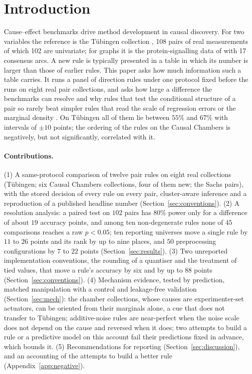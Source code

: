 \section{Introduction}\label{sec:intro}

Cause--effect benchmarks drive method development in causal discovery. For two variables the reference is the T\"ubingen collection \citep{mooij2016distinguishing}, 108 pairs of real measurements of which 102 are univariate; for graphs it is the protein-signalling data of \citet{sachs2005causal} with 17 consensus arcs. A new rule is typically presented in a table in which its number is larger than those of earlier rules. This paper asks how much information such a table carries. It runs a panel of direction rules under one protocol fixed before the runs on eight real pair collections, and asks how large a difference the benchmarks can resolve and why rules that test the conditional structure of a pair \citep{hoyer2009nonlinear,peters2014identifiability,hyvarinen2013pairwise,immer2023loci,lorch2022amortized} so rarely beat simpler rules that read the scale of regression errors or the marginal density \citep{blobaum2018cause,daniusis2010inferring,stienstra2026oneruler}. On T\"ubingen all of them lie between $55\%$ and $67\%$ with intervals of $\pm10$ points; the ordering of the rules on the Causal Chambers \citep{gamella2025chamber} is negatively, but not significantly, correlated with it.

\paragraph{Contributions.} (1) A same-protocol comparison of twelve pair rules on eight real collections (T\"ubingen; six Causal Chambers collections, four of them new; the Sachs pairs), with the stored decision of every rule on every pair, cluster-aware inference and a reproduction of a published headline number (Section~\ref{sec:conventions}). (2) A resolution analysis: a paired test on $102$ pairs has $80\%$ power only for a difference of about $19$ accuracy points, and among ten non-degenerate rules none of $45$ comparisons reaches a raw $p<0.05$; ten reporting universes move a single rule by $11$ to $26$ points and its rank by up to nine places, and $50$ preprocessing configurations by $7$ to $22$ points (Section~\ref{sec:results}). (3) Two unreported implementation conventions, the rounding of a quantiser and the treatment of tied values, that move a rule's accuracy by six and by up to $88$ points (Section~\ref{sec:conventions}). (4) Mechanism evidence, tested by prediction, matched manipulation with a control and leakage-free validation (Section~\ref{sec:mech}): the chamber collections, whose causes are experimenter-set actuators, can be oriented from their marginals alone, a cue that does not transfer to T\"ubingen; additive-noise rules are near-perfect when the noise scale does not depend on the cause and reversed when it does; two attempts to build a rule or a predictive model on this account fail their predictions fixed in advance, which bounds it. (5) Recommendations for reporting (Section~\ref{sec:discussion}), and an accounting of the attempts to build a better rule (Appendix~\ref{app:negative}).

